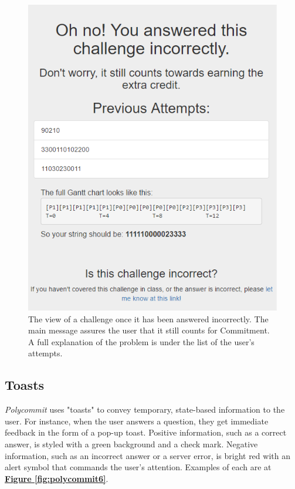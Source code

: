 \begin{figure}
	\includegraphics{figures/pc-incorrect}
	\caption{The view of a challenge once it has been answered incorrectly. The main message assures the user that it still counts for Commitment. A full explanation of the problem is under the list of the user's attempts.}
	\label{fig:polycommit5}
\end{figure}

\subsection{Toasts}
\par \textit{Polycommit} uses "toasts" to convey temporary, state-based information to the user. For instance, when the user answers a question, they get immediate feedback in the form of a pop-up toast. Positive information, such as a correct answer, is styled with a green background and a check mark. Negative information, such as an incorrect answer or a server error, is bright red with an alert symbol that commands the user's attention. Examples of each are at \textbf{\hyperref[fig:polycommit6]{Figure \ref*{fig:polycommit6}}}.


